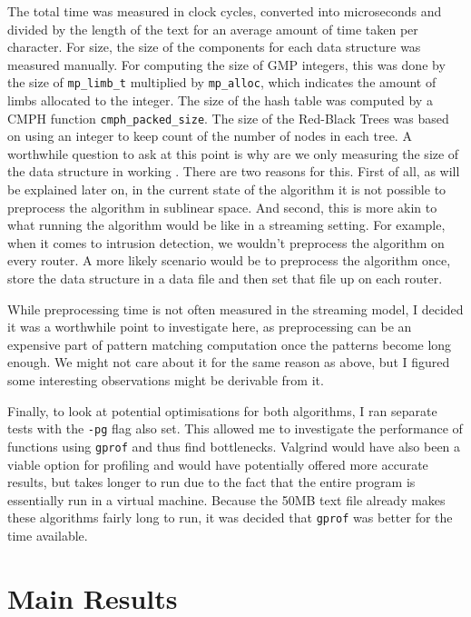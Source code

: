 \documentclass[ %
                    author={Dominic Joseph Moylett},
                    degree={MEng},
                     title={Dictionary Matching with Fingerprints},
                  subtitle={An Empirical Analysis},
                      type={research},
                      year={2015} ]{dissertation}
\begin{document}
The total time was measured in clock cycles, converted into microseconds and divided by the length of the text for an average amount of time taken per character. For size, the size of the components for each data structure was measured manually. For computing the size of GMP integers, this was done by the size of \texttt{mp\_limb\_t} multiplied by \texttt{mp\_alloc}, which indicates the amount of limbs allocated to the integer. The size of the hash table was computed by a CMPH function \texttt{cmph\_packed\_size}. The size of the Red-Black Trees was based on using an integer to keep count of the number of nodes in each tree. A worthwhile question to ask at this point is why are we only measuring the size of the data structure in working . There are two reasons for this. First of all, as will be explained later on, in the current state of the algorithm it is not possible to preprocess the algorithm in sublinear space. And second, this is more akin to what running the algorithm would be like in a streaming setting. For example, when it comes to intrusion detection, we wouldn't preprocess the algorithm on every router. A more likely scenario would be to preprocess the algorithm once, store the data structure in a data file and then set that file up on each router.

While preprocessing time is not often measured in the streaming model, I decided it was a worthwhile point to investigate here, as preprocessing can be an expensive part of pattern matching computation once the patterns become long enough. We might not care about it for the same reason as above, but I figured some interesting observations might be derivable from it.

Finally, to look at potential optimisations for both algorithms, I ran separate tests with the \texttt{-pg} flag also set. This allowed me to investigate the performance of functions using \texttt{gprof} and thus find bottlenecks. Valgrind would have also been a viable option for profiling and would have potentially offered more accurate results, but takes longer to run due to the fact that the entire program is essentially run in a virtual machine. Because the 50MB text file already makes these algorithms fairly long to run, it was decided that \texttt{gprof} was better for the time available.

\section{Main Results}
\end{document}
